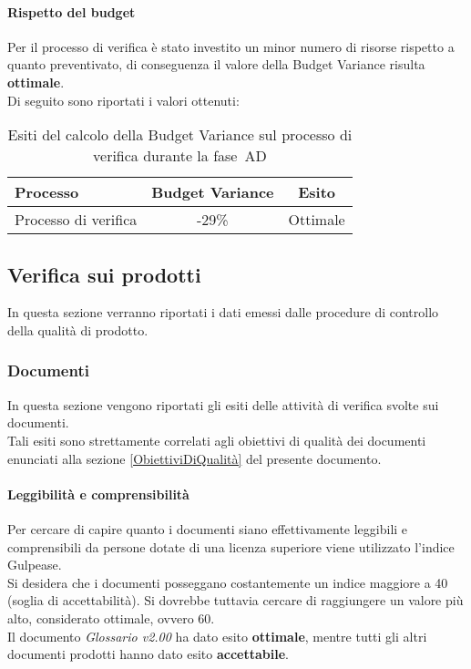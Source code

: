 \documentclass[../PianoDiQualifica.tex]{subfiles}
\begin{document}
\begin{appendices}
			\paragraph{Rispetto del budget}
			Per il processo di verifica è stato investito un minor numero di risorse rispetto a quanto preventivato, di conseguenza il valore della Budget Variance risulta \textbf{ottimale}.\\
			Di seguito sono riportati i valori ottenuti:
			\begin{table}[H]
				\centering
				\begin{tabular}{l * {2}{c}}
					\toprule
					\textbf{Processo} & \textbf{Budget Variance} & \textbf{Esito} \\
					\midrule
					Processo di verifica & -29\% &  Ottimale \\
					\bottomrule
				\end{tabular}
				\caption{Esiti del calcolo della Budget Variance sul processo di verifica durante la fase\g\ AD}
				\label{tab:esiti_budget_variance}
			\end{table}
			
			
	\subsection{Verifica sui prodotti}
	In questa sezione verranno riportati i dati emessi dalle procedure di controllo della qualità di prodotto\g.
		\subsubsection{Documenti}
		In questa sezione vengono riportati gli esiti delle attività di verifica svolte sui documenti.\\
		Tali esiti sono strettamente correlati agli obiettivi di qualità dei documenti enunciati alla sezione \ref{ObiettiviDiQualità} del presente documento.
			
			\paragraph{Leggibilità e comprensibilità}
			Per cercare di capire quanto i documenti siano effettivamente leggibili e comprensibili da persone dotate di una licenza superiore viene utilizzato l’indice Gulpease\g.\\
			Si desidera che i documenti posseggano costantemente un indice maggiore a 40 (soglia di accettabilità). Si dovrebbe tuttavia cercare di raggiungere un valore più alto, considerato ottimale, ovvero 60.\\
			Il documento \textit{Glossario v2.00} ha dato esito \textbf{ottimale}, mentre tutti gli altri documenti prodotti hanno dato esito \textbf{accettabile}.
			

\end{appendices}
\end{document}
